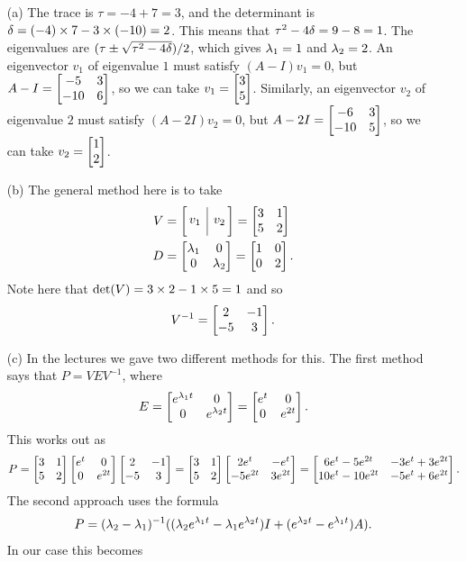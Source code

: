 \documentclass[a4paper]{amsart}
\begin{document}
\begin{solution}\leavevmode
 \begin{itemize}
  \item[(a)] The trace is $\tau=-4+7=3$, and the determinant is
   $\delta=(-4)\times 7-3\times(-10)=2$.  This means that $\tau^2-4\delta=9-8=1$.
   The eigenvalues are $(\tau\pm\sqrt{\tau^2-4\delta})/2$, which gives
   $\lambda_1=1$ and $\lambda_2=2$.  An eigenvector $v_1$ of eigenvalue $1$
   must satisfy $(A-I)v_1=0$, but $A-I=\left[\begin{matrix} -5&3 \\ -10&6\end{matrix}\right]$, so we
   can take $v_1=\left[\begin{matrix} 3\\ 5\end{matrix}\right]$.  Similarly, an eigenvector $v_2$ of
   eigenvalue $2$ must satisfy $(A-2I)v_2=0$, but
   $A-2I=\left[\begin{matrix} -6&3 \\ -10&5\end{matrix}\right]$, so we can take $v_2=\left[\begin{matrix} 1\\ 2\end{matrix}\right]$.
  \item[(b)] The general method here is to take 
   \begin{align*}
    V &= \barmat{v_1}{v_2} = \bbm 3 & 1 \\ 5 & 2 \ebm \\
    D &= \bbm \lm_1 & 0 \\ 0 & \lm_2 \ebm = \bbm 1&0 \\ 0&2 \ebm.
   \end{align*}
   Note here that $\det(V)=3\times 2 - 1\times 5=1$ and so 
   \[ V^{-1} = \left[\begin{matrix} 2 & -1 \\ -5 & 3 \end{matrix}\right]. \]
  \item[(c)] In the lectures we gave two different methods for this.
   The first method says that $P=VEV^{-1}$, where 
   \[ E=\left[\begin{matrix} e^{\lambda_1t} & 0 \\ 0 & e^{\lambda_2t} \end{matrix}\right] =
        \left[\begin{matrix} e^t & 0 \\ 0 & e^{2t} \end{matrix}\right].
   \]
   This works out as 
   \[ P = \left[\begin{matrix} 3 & 1 \\ 5 & 2 \end{matrix}\right]
          \left[\begin{matrix} e^t & 0 \\ 0 & e^{2t} \end{matrix}\right]
          \left[\begin{matrix} 2 & -1 \\ -5 & 3 \end{matrix}\right] 
        = \left[\begin{matrix} 3 & 1 \\ 5 & 2 \end{matrix}\right]
          \left[\begin{matrix} 2e^t & -e^t \\ -5e^{2t} & 3e^{2t} \end{matrix}\right] 
        = \left[\begin{matrix} 6e^t-5e^{2t} & -3e^t+3e^{2t} \\
               10e^t - 10e^{2t} & -5e^t + 6e^{2t} \end{matrix}\right].
   \]
   The second approach uses the formula
   \[ P=(\lambda_2-\lambda_1)^{-1}((\lambda_2e^{\lambda_1t}-\lambda_1e^{\lambda_2t})I +
                        (e^{\lambda_2t}-e^{\lambda_1t})A).
   \]
   In our case this becomes
   \begin{align*}

\end{align*}
\end{itemize}
\end{solution}
\end{document}
